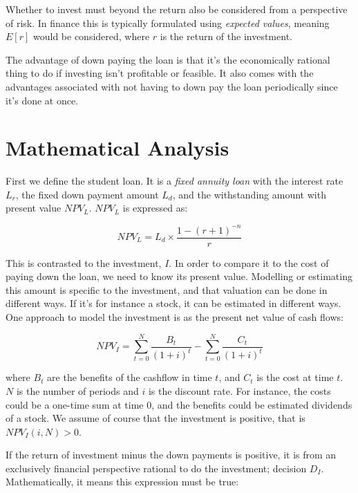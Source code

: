 \documentclass[a4paper]{article}
\begin{document}
Whether to invest must beyond the return also be considered from a perspective
of risk. In finance this is typically formulated using \emph{expected values},
meaning $E[r]$ would be considered, where $r$ is the return of the investment.

The advantage of down paying the loan is that it's the economically rational thing
to do if investing isn't profitable or feasible. It also comes with the
advantages associated with not having to down pay the loan periodically since
it's done at once.

\section{Mathematical Analysis}

First we define the student loan. It is a \emph{fixed annuity loan} with the
interest rate $L_r$, the fixed down payment amount $L_d$, and the withstanding
amount with present value $NPV_L$. $NPV_L$ is expressed as:

\def\NPVL{L_d \times \frac{1 - (r + 1)^{-n}}{r}}

\begin{equation}
NPV_L=\NPVL
\end{equation}

This is contrasted to the investment, $I$. In order to compare it to the cost of
paying down the loan, we need to know its present value. Modelling or estimating
this amount is specific to the investment, and that valuation can be done in
different ways. If it's for instance a stock, it can be estimated in different
ways. One approach to model the investment is as the present net value of cash
flows:

\def\NPV_I{\sum_{t=0}^{N} \frac{B_t}{(1 + i)^t} -
           \sum_{t=0}^{N} \frac{C_t}{(1 + i)^t}}

\begin{equation}
NPV_I = \NPV_I
\end{equation}

where $B_t$ are the benefits of the cashflow in time $t$, and $C_t$ is the cost
at time $t$. $N$ is the number of periods and $i$ is the discount rate. For
instance, the costs could be a one-time sum at time $0$, and the benefits could
be estimated dividends of a stock. We assume of course that the investment is
positive, that is $NPV_I(i, N) > 0$.

If the return of investment minus the down payments is positive, it is from an
exclusively financial perspective rational to do the investment; decision $D_I$.
Mathematically, it means this expression must be true:
\end{document}
